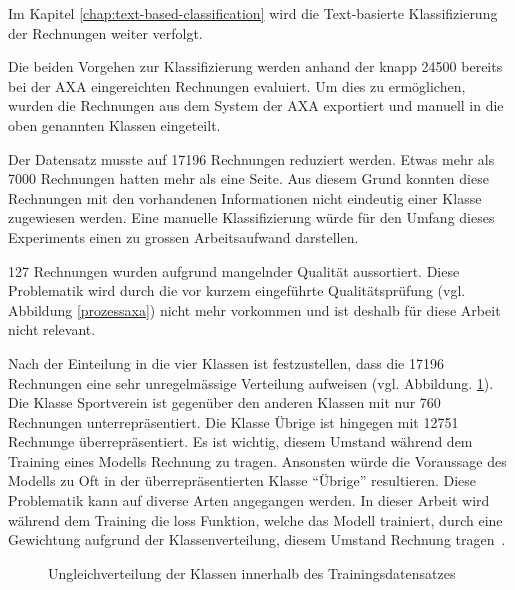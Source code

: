 Im Kapitel \ref{chap:text-based-classification} wird die Text-basierte Klassifizierung der Rechnungen weiter verfolgt.

Die beiden Vorgehen zur Klassifizierung werden anhand der knapp 24500 bereits bei der AXA eingereichten Rechnungen evaluiert. Um dies zu ermöglichen, wurden die Rechnungen aus dem System der AXA exportiert und manuell in die oben genannten Klassen eingeteilt. 

Der Datensatz musste auf 17196 Rechnungen reduziert werden. Etwas mehr als 7000 Rechnungen hatten mehr als eine Seite. Aus diesem Grund konnten diese Rechnungen mit den vorhandenen Informationen nicht eindeutig einer Klasse zugewiesen werden. Eine manuelle Klassifizierung würde für den Umfang dieses Experiments einen zu grossen Arbeitsaufwand darstellen.

127 Rechnungen wurden aufgrund mangelnder Qualität aussortiert. Diese Problematik wird durch die vor kurzem eingeführte Qualitätsprüfung (vgl. Abbildung \ref{prozessaxa}) nicht mehr vorkommen und ist deshalb für diese Arbeit nicht relevant.

Nach der Einteilung in die vier Klassen ist festzustellen, dass die 17196 Rechnungen eine sehr unregelmässige Verteilung aufweisen (vgl. Abbildung. \ref{class-distribution}). Die Klasse Sportverein ist gegenüber den anderen Klassen mit nur 760 Rechnungen unterrepräsentiert. Die Klasse Übrige ist hingegen mit 12751 Rechnunge überrepräsentiert. Es ist wichtig, diesem Umstand während dem Training eines Modells Rechnung zu tragen. Ansonsten würde die Voraussage des Modells zu Oft in der überrepräsentierten Klasse \enquote{Übrige} resultieren. Diese Problematik kann auf diverse Arten angegangen werden. In dieser Arbeit wird während dem Training die loss Funktion, welche das Modell trainiert, durch eine Gewichtung aufgrund der Klassenverteilung, diesem Umstand Rechnung tragen~\autocite{Buda2018}.

\begin{figure}[h]
    \captionsetup{width=.9\linewidth}
    \caption{Ungleichverteilung der Klassen innerhalb des Trainingsdatensatzes}
    \label{class-distribution}
    \centering
\end{figure}
